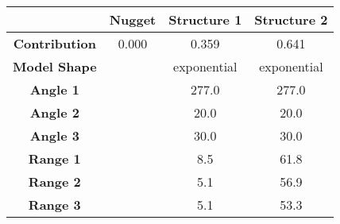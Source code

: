 \begin{tabular}{cccc}
\toprule
{} & Nugget &  Structure 1 &  Structure 2 \\
\midrule
\textbf{Contribution} &  0.000 &        0.359 &        0.641 \\
\textbf{Model Shape } &        &  exponential &  exponential \\
\textbf{Angle 1     } &        &        277.0 &        277.0 \\
\textbf{Angle 2     } &        &         20.0 &         20.0 \\
\textbf{Angle 3     } &        &         30.0 &         30.0 \\
\textbf{Range 1     } &        &          8.5 &         61.8 \\
\textbf{Range 2     } &        &          5.1 &         56.9 \\
\textbf{Range 3     } &        &          5.1 &         53.3 \\
\bottomrule
\end{tabular}
